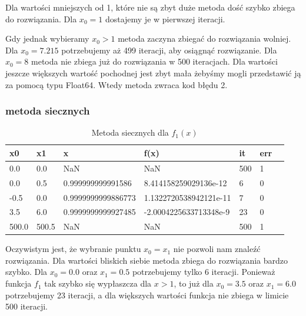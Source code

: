 \documentclass{article}
\begin{document}
Dla wartości mniejszych od 1, które nie są zbyt duże metoda dość szybko
zbiega do rozwiązania. Dla $x_0 = 1$ dostajemy je w pierwszej iteracji.

Gdy jednak wybieramy $x_0 > 1$ metoda zaczyna zbiegać do rozwiązania
wolniej. Dla $x_0 = 7.215$ potrzebujemy aż 499 iteracji, aby osiągnąć
rozwiązanie. Dla $x_0 = 8$ metoda nie zbiega już do rozwiązania w 500 iteracjach.
Dla wartości jeszcze większych wartość pochodnej jest zbyt mała żebyśmy mogli
przedstawić ją za pomocą typu Float64. Wtedy metoda zwraca kod błędu 2.

\subsubsection*{metoda siecznych}
\begin{table}[h]
  \centering
  \begin{tabular}{|l|l|l|l|l|l|l|}
  \hline
  \textbf{x0}    & \textbf{x1}        & \textbf{x}                   & \textbf{f(x)}                 & \textbf{it} & \textbf{err} \\ \hline
  0.0            & 0.0                & NaN                          & NaN                           & 500         & 1            \\ \hline
  0.0            & 0.5                & 0.999999999991586            & 8.414158259029136e-12         & 6           & 0            \\ \hline
  -0.5           & 0.0                & 0.9999999999886773           & 1.1322720538942121e-11        & 7           & 0            \\ \hline
  3.5            & 6.0                & 0.9999999999927485           & -2.0004225633713348e-9        & 23          & 0            \\ \hline
  500.0          & 500.5              & NaN                          & NaN                           & 500         & 1            \\ \hline
  \end{tabular}
  \caption{Metoda siecznych dla \( f_1(x) \)}
\end{table}
Oczywistym jest, że wybranie punktu $x_0 = x_1$ nie pozwoli nam
znaleźć rozwiązania. Dla wartości bliskich siebie metoda zbiega
do rozwiązania bardzo szybko. Dla $x_0 = 0.0$ oraz $x_1 = 0.5$
potrzebujemy tylko 6 iteracji. Ponieważ funkcja $f_1$ tak szybko
się wypłaszcza dla $x > 1$, to już dla $x_0 = 3.5$ oraz $x_1 = 6.0$
potrzebujemy 23 iteracji, a dla większych wartości funkcja
nie zbiega w limicie 500 iteracji.
\end{document}
